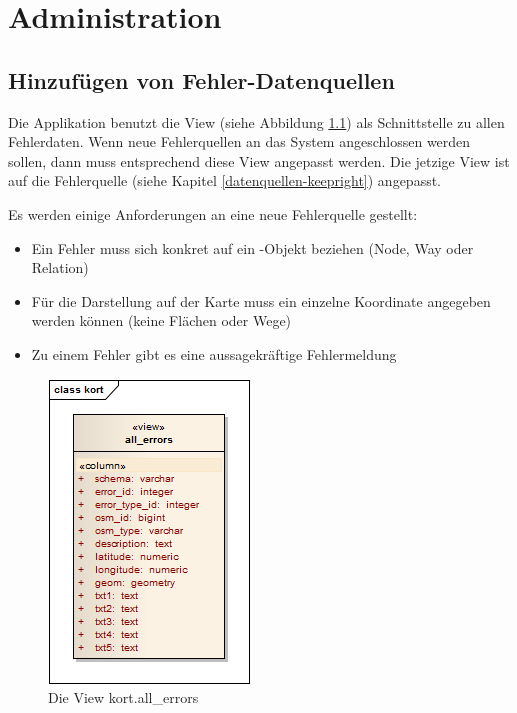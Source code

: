 \chapter{Administration}
\label{administration}

\section{Hinzufügen von Fehler-Datenquellen}
\label{additional-error-source}
Die Applikation benutzt die View  (siehe Abbildung \ref{image-kort-database-view-all_errors}) als Schnittstelle zu allen Fehlerdaten.
Wenn neue Fehlerquellen an das System angeschlossen werden sollen, dann muss entsprechend diese View angepasst werden.
Die jetzige View ist auf die Fehlerquelle  (siehe Kapitel \ref{datenquellen-keepright}) angepasst.

Es werden einige Anforderungen an eine neue Fehlerquelle gestellt:
\begin{itemize}
\item Ein Fehler muss sich konkret auf ein -Objekt beziehen (\gls{Node}, \gls{Way} oder \gls{Relation})
\item Für die Darstellung auf der Karte muss ein einzelne Koordinate angegeben werden können (keine Flächen oder Wege)
\item Zu einem Fehler gibt es eine aussagekräftige Fehlermeldung
\end{itemize}

\begin{figure}[H]
	\centering
	\includegraphics[scale=0.7]{images/uml/kort-database-view-all_errors}
	\caption{Die View kort.all\_errors}
	\label{image-kort-database-view-all_errors}
\end{figure}

